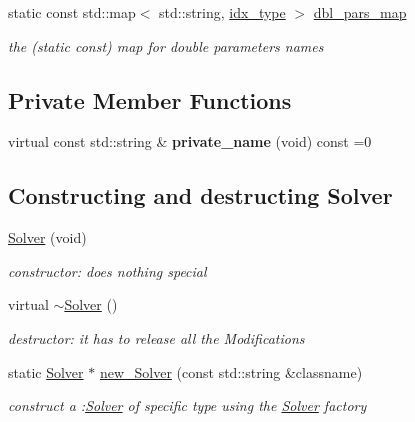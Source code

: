 \begin{DoxyCompactItemize}
\mbox{\label{class_s_m_spp__di__unipi__it_1_1_solver_a6b957220e6c94db6d583c75dd60095d6}} 
static const std\+::map$<$ std\+::string, \mbox{\hyperlink{class_s_m_spp__di__unipi__it_1_1_thin_compute_interface_aa3d710629ad8c434286726ad810c3b47}{idx\+\_\+type}} $>$ \mbox{\hyperlink{class_s_m_spp__di__unipi__it_1_1_solver_a6b957220e6c94db6d583c75dd60095d6}{dbl\+\_\+pars\+\_\+map}}
\begin{DoxyCompactList}\small\item\em the (static const) map for double parameters names \end{DoxyCompactList}\end{DoxyCompactItemize}
\subsection*{Private Member Functions}
\begin{DoxyCompactItemize}
\item 
\mbox{\label{class_s_m_spp__di__unipi__it_1_1_solver_aa74273c5d85179380eb4e54fd221fdc1}} 
virtual const std\+::string \& {\bfseries private\+\_\+name} (void) const =0
\end{DoxyCompactItemize}
\subsection*{Constructing and destructing Solver}
\begin{DoxyCompactItemize}
\item 
\mbox{\label{class_s_m_spp__di__unipi__it_1_1_solver_a6a5e38de103dc5a46feb9bd4ac48c3d5}} 
\mbox{\hyperlink{class_s_m_spp__di__unipi__it_1_1_solver_a6a5e38de103dc5a46feb9bd4ac48c3d5}{Solver}} (void)
\begin{DoxyCompactList}\small\item\em constructor\+: does nothing special \end{DoxyCompactList}\item 
virtual \mbox{\hyperlink{class_s_m_spp__di__unipi__it_1_1_solver_ab9c9ebc43a9ddc2636898389c2523ba0}{$\sim$\+Solver}} ()
\begin{DoxyCompactList}\small\item\em destructor\+: it has to release all the Modifications \end{DoxyCompactList}\item 
static \mbox{\hyperlink{class_s_m_spp__di__unipi__it_1_1_solver}{Solver}} $\ast$ \mbox{\hyperlink{class_s_m_spp__di__unipi__it_1_1_solver_a0e815f782f461461f585c5635d9fea6b}{new\+\_\+\+Solver}} (const std\+::string \&classname)
\begin{DoxyCompactList}\small\item\em construct a \+:\mbox{\hyperlink{class_s_m_spp__di__unipi__it_1_1_solver}{Solver}} of specific type using the \mbox{\hyperlink{class_s_m_spp__di__unipi__it_1_1_solver}{Solver}} factory \end{DoxyCompactList}\end{DoxyCompactItemize}


